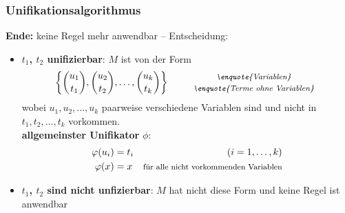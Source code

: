 \documentclass{beamer}
\begin{document}
\begin{frame} \frametitle{Unifikationsalgorithmus}
	\small
	\textbf{Ende:} keine Regel mehr anwendbar -- Entscheidung:
	\begin{itemize}
		\item \textbf{$t_1$, $t_2$ unifizierbar}: $M$ ist von der Form
		\begin{equation*}
			\menge{\binom{u_1}{t_1}, \binom{u_2}{t_2}, \dots, \binom{u_k}{t_k}} \qquad 
			\begin{array}{c} 
				\footnotesize \text{\textit{\enquote{Variablen}}} \\ 
				\footnotesize \text{\textit{\enquote{Terme ohne Variablen}}}
			\end{array}
		\end{equation*}
		wobei $u_1, u_2, \dots, u_k$ paarweise verschiedene Variablen sind und nicht in $t_1, t_2, \dots, t_k$ vorkommen.  \\
		\textbf{allgemeinster Unifikator} $\phi$: 
		\begin{equation*}
			\begin{aligned}
				\phi(u_i) &= t_i & (i = 1, \dots, k) \\
				\phi(x) &= x     & \footnotesize \text{für alle nicht vorkommenden Variablen}
			\end{aligned}
		\end{equation*}
		\item \textbf{$t_1$, $t_2$ sind nicht unfizierbar}: $M$ hat nicht diese Form und keine Regel ist anwendbar
	\end{itemize}
\end{frame}


\end{document}
